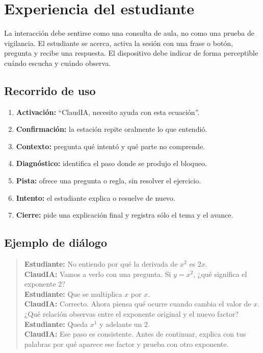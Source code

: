 \documentclass[letterpaper,11pt]{article}
\begin{document}
\clearpage

\section{Experiencia del estudiante}

La interacción debe sentirse como una consulta de aula, no como una prueba de vigilancia. El estudiante se acerca, activa la sesión con una frase o botón, pregunta y recibe una respuesta. El dispositivo debe indicar de forma perceptible cuándo escucha y cuándo observa.

\subsection{Recorrido de uso}
\begin{enumerate}
  \item \textbf{Activación:} ``ClaudIA, necesito ayuda con esta ecuación''.
  \item \textbf{Confirmación:} la estación repite oralmente lo que entendió.
  \item \textbf{Contexto:} pregunta qué intentó y qué parte no comprende.
  \item \textbf{Diagnóstico:} identifica el paso donde se produjo el bloqueo.
  \item \textbf{Pista:} ofrece una pregunta o regla, sin resolver el ejercicio.
  \item \textbf{Intento:} el estudiante explica o resuelve de nuevo.
  \item \textbf{Cierre:} pide una explicación final y registra sólo el tema y el avance.
\end{enumerate}

\subsection{Ejemplo de diálogo}
\begin{quote}
\small
\textbf{Estudiante:} No entiendo por qué la derivada de $x^2$ es $2x$.\\
\textbf{ClaudIA:} Vamos a verlo con una pregunta. Si $y=x^2$, ¿qué significa el exponente 2?\\
\textbf{Estudiante:} Que se multiplica $x$ por $x$.\\
\textbf{ClaudIA:} Correcto. Ahora piensa qué ocurre cuando cambia el valor de $x$. ¿Qué relación observas entre el exponente original y el nuevo factor?\\
\textbf{Estudiante:} Queda $x^1$ y adelante un 2.\\
\textbf{ClaudIA:} Ese paso es consistente. Antes de continuar, explica con tus palabras por qué aparece ese factor y prueba con otro exponente.
\end{quote}
\end{document}
